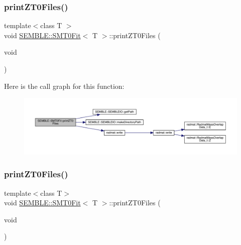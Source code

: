 \subsubsection{\texorpdfstring{printZT0Files()}{printZT0Files()}\hspace{0.1cm}{\footnotesize\ttfamily [1/2]}}
{\footnotesize\ttfamily template$<$class T $>$ \\
void \mbox{\hyperlink{structSEMBLE_1_1SMT0Fit}{S\+E\+M\+B\+L\+E\+::\+S\+M\+T0\+Fit}}$<$ T $>$\+::print\+Z\+T0\+Files (\begin{DoxyParamCaption}\item[{void}]{ }\end{DoxyParamCaption})}

Here is the call graph for this function\+:
\nopagebreak
\begin{figure}[H]
\begin{center}
\leavevmode
\includegraphics[width=350pt]{d6/dad/structSEMBLE_1_1SMT0Fit_a503743e09b5c5f01d6b568dbd5d1ab5a_cgraph}
\end{center}
\end{figure}
\mbox{\label{structSEMBLE_1_1SMT0Fit_a503743e09b5c5f01d6b568dbd5d1ab5a}} 
\subsubsection{\texorpdfstring{printZT0Files()}{printZT0Files()}\hspace{0.1cm}{\footnotesize\ttfamily [2/2]}}
{\footnotesize\ttfamily template$<$class T$>$ \\
void \mbox{\hyperlink{structSEMBLE_1_1SMT0Fit}{S\+E\+M\+B\+L\+E\+::\+S\+M\+T0\+Fit}}$<$ T $>$\+::print\+Z\+T0\+Files (\begin{DoxyParamCaption}\item[{void}]{ }\end{DoxyParamCaption})}

\mbox{\label{structSEMBLE_1_1SMT0Fit_af8e7b3bd0f80d0f4eda9c02d0aa89912}} 
